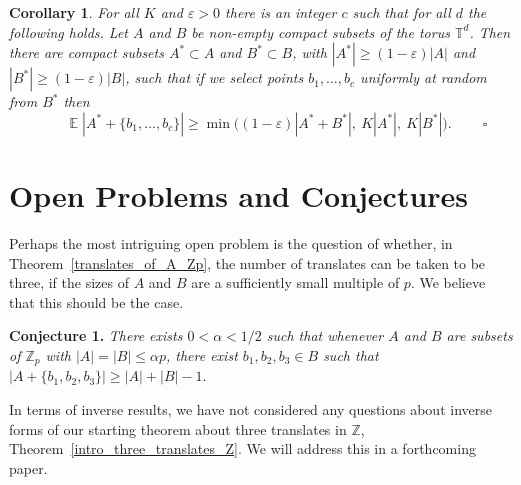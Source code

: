 \documentclass[12pt,reqno]{amsart}
\DeclareMathOperator*{\E}{\mathbb{E}}
\newtheorem{corollary}[theorem]{Corollary}
\theoremstyle{definition}
\renewcommand\leq{\leqslant}
\renewcommand\geq{\geqslant}
\renewcommand\ge{\geqslant}
\begin{document}
\begin{corollary}\label{cont_implication_shao1-prov}
For all $K$ and $\varepsilon >0$ there is an integer $c$ such that for all $d$ the following holds.
Let $A$ and $B$ be non-empty compact subsets of the torus $\mathbb{T}^d$. Then there are compact subsets $A^* \subset A$
and $B^* \subset B$, with $|A^*|\ge (1-\varepsilon)|A|$ and
$|B^*|\ge (1-\varepsilon)|B|$, such that if we select points $b_1,\hdots,b_c$ uniformly at random from
$B^*$ then
\[
\ \ \ \ \ \ \ \ \ \  \E |A^*+ \{b_1,\hdots,b_c\}|
\geq \min\big( (1-\varepsilon)|A^*+ B^*|,\ K |A^*|,\ K |B^*| \big). \ \ \ \ \ \ \ \ \ \ \square
\]
\end{corollary}

\section{Open Problems and Conjectures}

\vspace{5pt}
Perhaps the most intriguing open problem is the question of whether, in
Theorem~\ref{translates_of_A_Zp}, the number
of translates can be taken to be three, if the sizes of $A$ and $B$ are a sufficiently small
multiple of $p$. We
believe that this should be the case.

\vspace{5pt}
{\bf Conjecture 1. }{\em
There exists $0< \alpha < 1/2$ such that whenever
$A$ and $B$ are subsets of $\mathbb{Z}_p$ with $|A|=|B|\leq \alpha p$,
there exist $b_1, b_2, b_3 \in B$ such that $|A+\{b_1,b_2,b_3\}| \ge |A|+|B|-1.$
}

\vspace{5pt}
In terms of inverse results, we have not considered any questions about inverse forms of our starting theorem about
three translates in $\mathbb{Z}$, Theorem~\ref{intro_three_translates_Z}. We will address this in a forthcoming paper.

\end{document}
